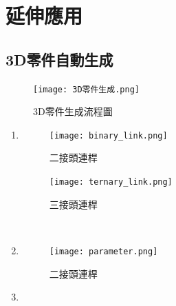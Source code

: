 \documentclass[14pt,a4paper]{report}  %
\newcommand{\fourteen}{\fontsize{14pt}{\baselineskip}\selectfont}%
\begin{document}
{%
    \chapter{延伸應用}
	\section{3D零件自動生成}
	\begin{flushleft}
	\fourteen {完成機構設計後接著就要進入CAD階段，不過在此階段常面臨突然遇到有其他的因素導致需要修改尺寸，此時若以手動將一個個零件一一重新修改會浪費許多時間，因此本專題建立一程式流程來進行參數化修改。}
	\end{flushleft}
	\begin{figure}[hbt!]
        \centering
        \texttt{[image: 3D零件生成.png]}
        \caption{3D零件生成流程圖}
        \label{fig_3Dparts:scale}
    \end{figure}
    
	
	\newpage
	\begin{enumerate}
	\item{
	\fourteen{繪製零件:建立後續會用到的零件}
	\begin{figure}[hbt!]
        \centering
        \texttt{[image: binary\_link.png]}
        \caption{二接頭連桿}
        \label{fig_binary_link:scale}
        
        \centering
        \texttt{[image: ternary\_link.png]}
        \caption{三接頭連桿}
        \label{fig_ternary_link:scale}
    \end{figure}
    }\\
    
	
	\item
	{
	\begin{flushleft}
	\fourteen{關鍵尺寸設定:將所需要的零件關鍵尺寸找出並在CAD軟體中建立該參數}
	\begin{figure}[hbt!]
        \centering
        \texttt{[image: parameter.png]}
        \caption{二接頭連桿}
        \label{fig_binary_link:scale}
    \end{figure}
	\end{flushleft}
	}
	
	\item{
	\begin{flushleft}
	\fourteen{程式流程:該流程主要由我們自行撰寫程式來完成，其中會利用pywin32模組找到在電腦中的CAD軟體並開啟接著將找到要修改的零件模型的路徑並開啟，再將前面設定完成的尺寸參數名稱帶入函式中並輸入想要的數值，修改完畢後再更新零件才能在CAD軟體中看到修改後的變化，最後進行儲存的動作。}    	
    \end{flushleft}
    }
	\end{enumerate}    
    
}
\end{document}
